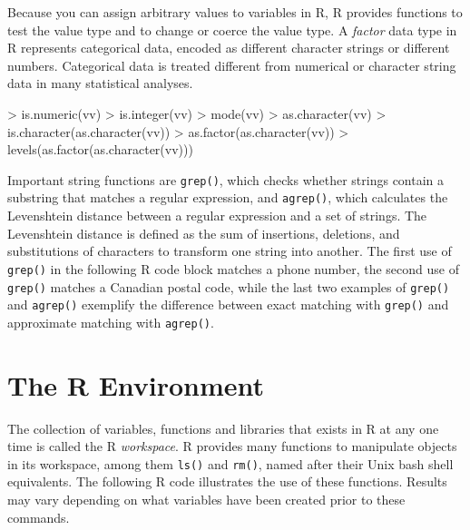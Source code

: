 Because you can assign arbitrary values to variables in R, R provides functions to test the value type and to change or coerce the value type. A \emph{factor} data type in R represents categorical data, encoded as different character strings or different numbers. Categorical data is treated different from numerical or character string data in many statistical analyses.

\begin{samepage}
\begin{Rcode}
> is.numeric(vv)
> is.integer(vv)
> mode(vv)
> as.character(vv)
> is.character(as.character(vv))
> as.factor(as.character(vv))
> levels(as.factor(as.character(vv)))
\end{Rcode}
\end{samepage}

Important string functions are \texttt{grep()}, which checks whether strings contain a substring that matches a regular expression, and \texttt{agrep()}, which calculates the Levenshtein distance between a regular expression and a set of strings. The Levenshtein distance is defined as the sum of insertions, deletions, and substitutions of characters to transform one string into another. The first use of \texttt{grep()} in the following R code block matches a phone number, the second use of \texttt{grep()} matches a Canadian postal code, while the last two examples of \texttt{grep()} and \texttt{agrep()} exemplify the difference between exact matching with \texttt{grep()} and approximate matching with \texttt{agrep()}.

\begin{samepage}
\end{samepage}

\section{The R Environment}

The collection of variables, functions and libraries that exists in R at any one time is called the R \emph{workspace}. R provides many functions to manipulate objects in its workspace, among them \texttt{ls()} and \texttt{rm()}, named after their Unix bash shell equivalents. The following R code illustrates the use of these functions. Results may vary depending on what variables have been created prior to these commands.


